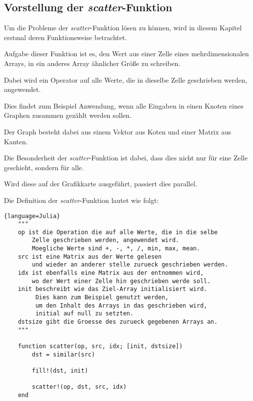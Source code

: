 \subsection{Vorstellung der \textit{scatter}-Funktion} \label{sec:vorstellung}

Um die Probleme der \textit{scatter}-Funktion lösen zu können, 
wird in diesem Kapitel erstmal deren Funktionsweise betrachtet.

Aufgabe dieser Funktion ist es, den Wert aus einer Zelle 
eines mehrdimensionalen Arrays, in ein anderes Array ähnlicher Größe zu schreiben.

Dabei wird ein Operator auf alle Werte, die in dieselbe Zelle
geschrieben werden, angewendet.

Dies findet zum Beispiel Anwendung, wenn alle Eingaben in einen Knoten eines Graphen zusammen gezählt werden sollen.

Der Graph besteht dabei aus einem Vektor aus Koten 
und einer Matrix aus Kanten.

Die Besonderheit der \textit{scatter}-Funktion ist dabei, 
dass dies nicht nur für eine Zelle geschieht, sondern für alle.

Wird diese auf der Grafikkarte ausgeführt, passiert dies parallel.

Die Definition der \textit{scatter}-Funktion lautet wie folgt:

\begin{lstlisting}{language=Julia}
	"""
	op ist die Operation die auf alle Werte, die in die selbe 
	    Zelle geschrieben werden, angewendet wird.
		Moegliche Werte sind +, -, *, /, min, max, mean.
	src ist eine Matrix aus der Werte gelesen 
	    und wieder an anderer stelle zurueck geschrieben werden.
	idx ist ebenfalls eine Matrix aus der entnommen wird,
	    wo der Wert einer Zelle hin geschrieben werde soll.
	init beschreibt wie das Ziel-Array initialisiert wird.
	     Dies kann zum Beispiel genutzt werden, 
		 um den Inhalt des Arrays in das geschrieben wird, 
		 initial auf null zu setzten.
	dstsize gibt die Groesse des zurueck gegebenen Arrays an.
	"""

	function scatter(op, src, idx; [init, dstsize])
		dst = similar(src)
		
		fill!(dst, init)
		
		scatter!(op, dst, src, idx)
	end
\end{lstlisting}

